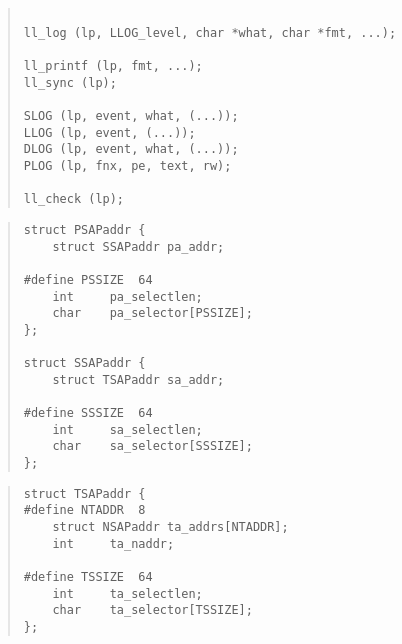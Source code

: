 \begin{bwslide}

\begin{quote}\small\begin{verbatim}

ll_log (lp, LLOG_level, char *what, char *fmt, ...);

ll_printf (lp, fmt, ...);
ll_sync (lp);

SLOG (lp, event, what, (...));
LLOG (lp, event, (...));
DLOG (lp, event, what, (...));
PLOG (lp, fnx, pe, text, rw);

ll_check (lp);
\end{verbatim}\end{quote}
\end{bwslide}


\begin{bwslide}

\begin{quote}\small\begin{verbatim}
struct PSAPaddr {
    struct SSAPaddr pa_addr;

#define PSSIZE  64
    int     pa_selectlen;
    char    pa_selector[PSSIZE];
};

struct SSAPaddr {
    struct TSAPaddr sa_addr;

#define SSSIZE  64
    int     sa_selectlen;
    char    sa_selector[SSSIZE];
};
\end{verbatim}\end{quote}
\end{bwslide}


\begin{bwslide}

\begin{quote}\small\begin{verbatim}
struct TSAPaddr {
#define NTADDR  8
    struct NSAPaddr ta_addrs[NTADDR];
    int     ta_naddr;

#define TSSIZE  64
    int     ta_selectlen;
    char    ta_selector[TSSIZE];
};
\end{verbatim}\end{quote}
\end{bwslide}


